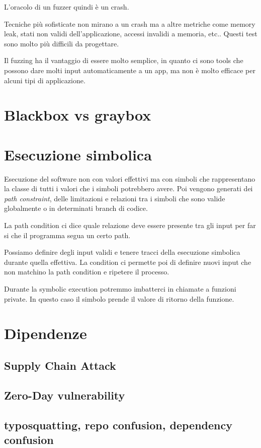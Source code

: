 \documentclass{article}
\begin{document}
L'oracolo di un fuzzer quindi è un crash.

Tecniche più sofisticate non mirano a un crash ma a altre metriche come memory leak, stati non validi dell'applicazione, accessi invalidi a memoria, etc.. Questi test sono molto più difficili da progettare.

Il fuzzing ha il vantaggio di essere molto semplice, in quanto ci sono tools che possono dare molti input automaticamente a un app, ma non è molto efficace per alcuni tipi di applicazione.

\section{Blackbox vs graybox}

\section{Esecuzione simbolica}
Esecuzione del software non con valori effettivi ma con simboli che rappresentano la classe di tutti i valori che i simboli potrebbero avere. Poi vengono generati dei \textit{path constraint}, delle limitazioni e relazioni tra i simboli che sono valide globalmente o in determinati branch di codice.

La path condition ci dice quale relazione deve essere presente tra gli input per far si che il programma segua un certo path.

Possiamo definire degli input validi e tenere tracci della esecuzione simbolica durante quella effettiva. La condition ci permette poi di definire nuovi input che non matchino la path condition e ripetere il processo.

Durante la symbolic execution potremmo imbatterci in chiamate a funzioni private. In questo caso il simbolo prende il valore di ritorno della funzione.

\section{Dipendenze}
\subsection{Supply Chain Attack}
\subsection{Zero-Day vulnerability}
\subsection{typosquatting, repo confusion, dependency confusion}
\end{document}
